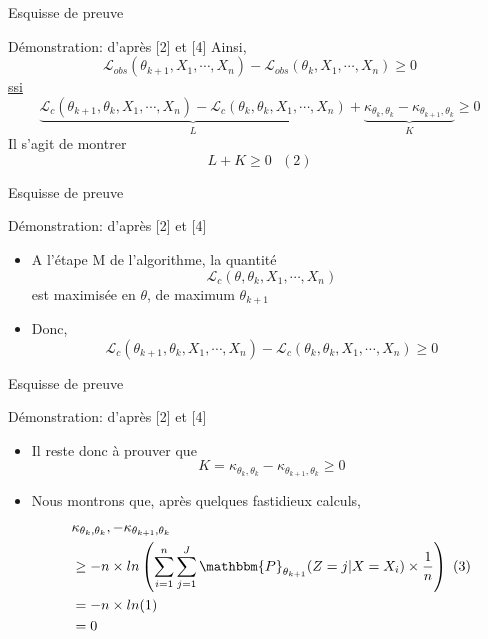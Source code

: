 \documentclass[11pt]{beamer}
\begin{document}
	\begin{frame}{Esquisse de preuve}
		\scriptsize
		\begin{block}{Démonstration: d'après [2] et [4]}
				Ainsi,
				\[
				\mathcal{L}_{obs}(\theta_{k+1}, X_1, \cdots, X_n) - \mathcal{L}_{obs}(\theta_k, X_1, \cdots, X_n) \geq 0
				\]
				\underline{ssi}
				\[
				\underbrace{\mathcal{L}_c(\theta_{k+1}, \theta_k, X_1, \cdots, X_n) - \mathcal{L}_c(\theta_k, \theta_k, X_1, \cdots, X_n)}_{L} + \underbrace{\kappa_{\theta_{k}, \theta_k}  - \kappa_{\theta_{k+1}, \theta_k}}_{K} \geq 0
				\]
Il s'agit de montrer 
				\[
			L + K \geq 0 \text{   } (2)
				\]
		\end{block}
	\end{frame}


	\begin{frame}{Esquisse de preuve}
		\begin{block}{Démonstration: d'après [2] et [4]}
			\begin{itemize}
				\item A l'étape M de l'algorithme, la quantité 
					\[
					\mathcal{L}_c(\theta, \theta_k, X_1, \cdots, X_n)
					\]
est maximisée en $\theta$, de maximum $\theta_{k+1}$
				\item Donc,
					\[
					\mathcal{L}_c(\theta_{k+1}, \theta_k, X_1, \cdots, X_n) - \mathcal{L}_c(\theta_k, \theta_k, X_1, \cdots, X_n) \geq 0
					\]
			\end{itemize}
		\end{block}
	\end{frame}

	\begin{frame}{Esquisse de preuve}
		\begin{block}{Démonstration: d'après [2] et [4]}
			\scriptsize
			\begin{itemize}
				\item Il reste donc à prouver que
					\[
					 K = \kappa_{\theta_{k}, \theta_k} - \kappa_{\theta_{k+1}, \theta_k} \geq 0
					\]
				\item Nous montrons que, après quelques fastidieux calculs,
				\begin{align*}
					& \kappa_{\theta_{k}, \theta_k}, - \kappa_{\theta_{k+1}, \theta_k} \\
					& \geq - n\times ln\left( \sum_{i=1}^n\sum_{j=1}^J\mathbbm{P}_{\theta_{k+1}}(Z = j|X=X_i)\times\frac{1}{n}\right)  \text{  }  (3) \\
					&=  -n\times ln(1)\\
					&= 0
				\end{align*}
			\end{itemize}
		\end{block}
	\end{frame}
\end{document}
